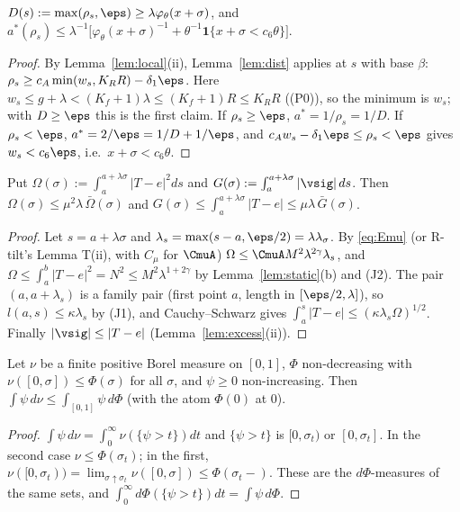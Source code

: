 \begin{lemma}[D: distance]\label{lem:Nd}
$D(s):=\max(\rho_s,\eps)\ge\lambda\varphi_\theta(x+\sigma)$, and $a^*(\rho_s)\le\lambda^{-1}\bigl[\varphi_\theta(x+\sigma)^{-1}
+\theta^{-1}\mathbf 1\{x+\sigma<c_6\theta\}\bigr]$.
\end{lemma}
\begin{proof}
By Lemma~\ref{lem:local}(ii), Lemma~\ref{lem:dist} applies at $s$ with base $\beta$: $\rho_s\ge c_A\min(w_s,K_RR)-\delta_1\eps$.
Here $w_s\le g+\lambda<(K_f+1)\lambda\le(K_f+1)R\le K_RR$ ((P0)), so the minimum is $w_s$; with $D\ge\eps$ this is the first claim.
If $\rho_s\ge\eps$, $a^*=1/\rho_s=1/D$. If $\rho_s<\eps$, $a^*=2/\eps=1/D+1/\eps$, and $c_Aw_s-\delta_1\eps\le\rho_s<\eps$ gives
$w_s<c_6\eps$, i.e.\ $x+\sigma<c_6\theta$.
\end{proof}

\begin{lemma}[B: budgets]\label{lem:Nb}
Put $\Omega(\sigma):=\int_a^{a+\lambda\sigma}|T-e|^2ds$ and $G(\sigma):=\int_a^{a+\lambda\sigma}|\vsig|\,ds$. Then
$\Omega(\sigma)\le\mu^2\lambda\,\bar\Omega(\sigma)$ and $G(\sigma)\le\int_a^{a+\lambda\sigma}|T-e|\le\mu\lambda\,\bar G(\sigma)$.
\end{lemma}
\begin{proof}
Let $s=a+\lambda\sigma$ and $\lambda_s=\max(s-a,\eps/2)=\lambda\lambda_\sigma$. By \eqref{eq:Emu} (or R-tilt's Lemma T(ii), with
$C_\mu$ for $\CmuA$) $\Omega\le\CmuA M^2\lambda^{2\gamma}\lambda_s$, and $\Omega\le\int_a^b|T-e|^2=N^2\le M^2\lambda^{1+2\gamma}$ by
Lemma~\ref{lem:static}(b) and (J2). The pair $(a,a+\lambda_s)$ is a family pair (first point $a$, length in $[\eps/2,\lambda]$),
so $l(a,s)\le\kappa\lambda_s$ by (J1), and Cauchy--Schwarz gives $\int_a^s|T-e|\le(\kappa\lambda_s\Omega)^{1/2}$. Finally
$|\vsig|\le|T-e|$ (Lemma~\ref{lem:excess}(ii)).
\end{proof}

\begin{lemma}\label{lem:Nl}
Let $\nu$ be a finite positive Borel measure on $[0,1]$, $\Phi$ non-decreasing with $\nu([0,\sigma])\le\Phi(\sigma)$ for all
$\sigma$, and $\psi\ge0$ non-increasing. Then $\int\psi\,d\nu\le\int_{[0,1]}\psi\,d\Phi$ (with the atom $\Phi(0)$ at $0$).
\end{lemma}
\begin{proof}
$\int\psi\,d\nu=\int_0^\infty\nu(\{\psi>t\})dt$ and $\{\psi>t\}$ is $[0,\sigma_t)$ or $[0,\sigma_t]$. In the second case
$\nu\le\Phi(\sigma_t)$; in the first, $\nu([0,\sigma_t))=\lim_{\sigma\uparrow\sigma_t}\nu([0,\sigma])\le\Phi(\sigma_t-)$. These are the
$d\Phi$-measures of the same sets, and $\int_0^\infty d\Phi(\{\psi>t\})dt=\int\psi\,d\Phi$.
\end{proof}


